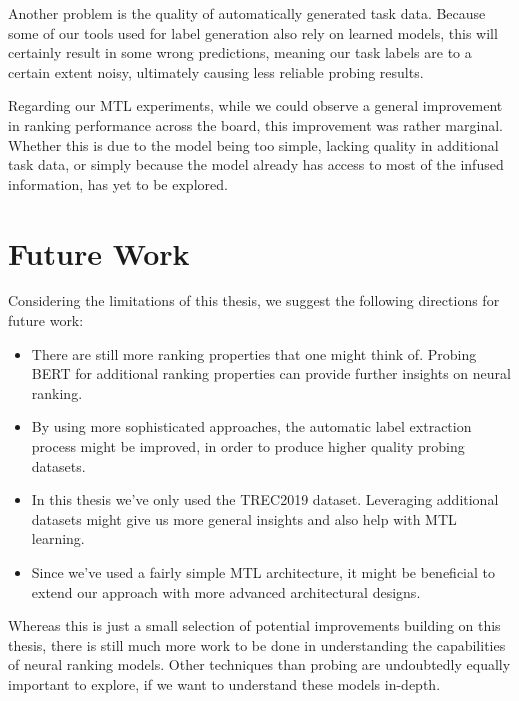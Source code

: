 Another problem is the quality of automatically generated task data. Because some of our tools used for label generation also rely on learned models, this will certainly result in some wrong predictions, meaning our task labels are to a certain extent noisy, ultimately causing less reliable probing results.

Regarding our MTL experiments, while we could observe a general improvement in ranking performance across the board, this improvement was rather marginal. Whether this is due to the model being too simple, lacking quality in additional task data, or simply because the model already has access to most of the infused information, has yet to be explored.

\section{Future Work}
\label{sec:future}
Considering the limitations of this thesis, we suggest the following directions for future work:
\begin{itemize}
    \item There are still more ranking properties that one might think of. Probing BERT for additional ranking properties can provide further insights on neural ranking.
    \item By using more sophisticated approaches, the automatic label extraction process might be improved, in order to produce higher quality probing datasets.
    \item In this thesis we've only used the TREC2019 dataset. Leveraging additional datasets might give us more general insights and also help with MTL learning.
    \item Since we've used a fairly simple MTL architecture, it might be beneficial to extend our approach with more advanced architectural designs.
\end{itemize}
Whereas this is just a small selection of potential improvements building on this thesis, there is still much more work to be done in understanding the capabilities of neural ranking models. Other techniques than probing are undoubtedly equally important to explore, if we want to understand these models in-depth.
